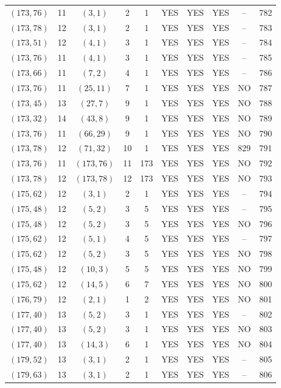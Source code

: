\begin{longtable}{|c|c|c|c|c|c|c|c|c|c|}
$(173, 76)$ & 11 & $(3, 1)$ & 2 & 1 & YES & YES & YES & -- & 782\\
$(173, 78)$ & 12 & $(3, 1)$ & 2 & 1 & YES & YES & YES & -- & 783\\
$(173, 51)$ & 12 & $(4, 1)$ & 3 & 1 & YES & YES & YES & -- & 784\\
$(173, 76)$ & 11 & $(4, 1)$ & 3 & 1 & YES & YES & YES & -- & 785\\
$(173, 66)$ & 11 & $(7, 2)$ & 4 & 1 & YES & YES & YES & -- & 786\\
$(173, 76)$ & 11 & $(25, 11)$ & 7 & 1 & YES & YES & YES & NO & 787\\
$(173, 45)$ & 13 & $(27, 7)$ & 9 & 1 & YES & YES & YES & NO & 788\\
$(173, 32)$ & 14 & $(43, 8)$ & 9 & 1 & YES & YES & YES & NO & 789\\
$(173, 76)$ & 11 & $(66, 29)$ & 9 & 1 & YES & YES & YES & NO & 790\\
$(173, 78)$ & 12 & $(71, 32)$ & 10 & 1 & YES & YES & YES & 829 & 791\\
$(173, 76)$ & 11 & $(173, 76)$ & 11 & 173 & YES & YES & YES & NO & 792\\
$(173, 78)$ & 12 & $(173, 78)$ & 12 & 173 & YES & YES & YES & NO & 793\\
$(175, 62)$ & 12 & $(3, 1)$ & 2 & 1 & YES & YES & YES & -- & 794\\
$(175, 48)$ & 12 & $(5, 2)$ & 3 & 5 & YES & YES & YES & -- & 795\\
$(175, 48)$ & 12 & $(5, 2)$ & 3 & 5 & YES & YES & YES & NO & 796\\
$(175, 62)$ & 12 & $(5, 1)$ & 4 & 5 & YES & YES & YES & -- & 797\\
$(175, 62)$ & 12 & $(5, 2)$ & 3 & 5 & YES & YES & YES & NO & 798\\
$(175, 48)$ & 12 & $(10, 3)$ & 5 & 5 & YES & YES & YES & NO & 799\\
$(175, 62)$ & 12 & $(14, 5)$ & 6 & 7 & YES & YES & YES & NO & 800\\
$(176, 79)$ & 12 & $(2, 1)$ & 1 & 2 & YES & YES & YES & NO & 801\\
$(177, 40)$ & 13 & $(5, 2)$ & 3 & 1 & YES & YES & YES & -- & 802\\
$(177, 40)$ & 13 & $(5, 2)$ & 3 & 1 & YES & YES & YES & NO & 803\\
$(177, 40)$ & 13 & $(14, 3)$ & 6 & 1 & YES & YES & YES & NO & 804\\
$(179, 52)$ & 13 & $(3, 1)$ & 2 & 1 & YES & YES & YES & -- & 805\\
$(179, 63)$ & 13 & $(3, 1)$ & 2 & 1 & YES & YES & YES & -- & 806\\

\end{longtable}

